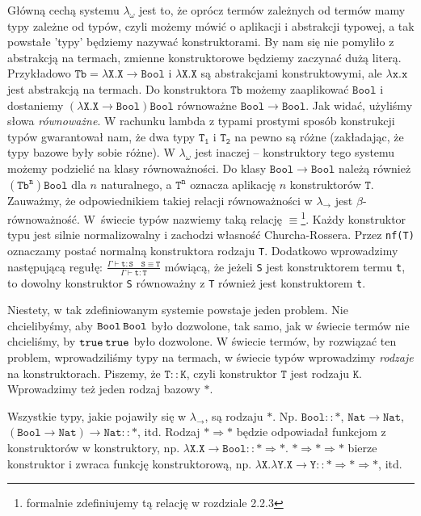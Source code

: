 \documentclass[11pt,leqno]{article}
\begin{document}
Główną cechą systemu $\lambda_{\omega}$ jest to, że oprócz termów zależnych od termów mamy typy zależne od typów, czyli możemy mówić o aplikacji i abstrakcji typowej, a tak powstałe 'typy' będziemy nazywać konstruktorami. By nam się nie pomyliło z abstrakcją na termach, zmienne konstruktorowe będziemy zaczynać dużą literą. Przykładowo $\mathtt{Tb=\lambda X.X \rightarrow Bool}$ i $\mathtt{\lambda X.X}$ są abstrakcjami konstruktowymi, ale $\mathtt{\lambda x.x}$ jest abstrakcją na termach. 
Do konstruktora $\mathtt{Tb}$ możemy zaaplikować $\mathtt{Bool}$ i dostaniemy $\mathtt{(\lambda X.X \rightarrow Bool)Bool}$ równoważne $\mathtt{Bool \rightarrow Bool}$. Jak widać, użyliśmy słowa \textit{równoważne}. W rachunku lambda z typami prostymi sposób konstrukcji typów gwarantował nam, że dwa typy $\mathtt{T_1}$ i $\mathtt{T_2}$ na pewno są różne (zakładając, że typy bazowe były sobie różne). W $\lambda_{\omega}$ jest inaczej -- konstruktory tego systemu możemy podzielić na klasy równoważności. Do klasy $\mathtt{Bool \rightarrow Bool}$ należą również $\mathtt{ (Tb^n) Bool }$ dla $n$ naturalnego, a $\mathtt{T^n}$ oznacza aplikację $n$ konstruktorów $\mathtt{T}$.
Zauważmy, że odpowiednikiem takiej relacji równoważności w $\lambda_{\rightarrow}$  jest $\beta$-równoważność. W~świecie typów nazwiemy taką relację $\equiv$\footnote{formalnie zdefiniujemy tą relację w rozdziale 2.2.3}. Każdy konstruktor typu jest silnie normalizowalny i zachodzi własność Churcha-Rossera. Przez \texttt{nf(T)} oznaczamy postać normalną konstruktora rodzaju \texttt{T}.
Dodatkowo wprowadzimy następującą regułę:
$\mathtt{\frac{\Gamma \vdash t:S \hspace{1em} S\equiv T  }{\Gamma \vdash t:T}}$
mówiącą, że jeżeli \texttt{S} jest konstruktorem termu \texttt{t}, to dowolny konstruktor \texttt{S} równoważny z \texttt{T} również jest konstruktorem \texttt{t}.  

Niestety, w tak zdefiniowanym systemie powstaje jeden problem. Nie chcielibyśmy, aby $\mathtt{Bool \hspace{0.2em} Bool}$ było dozwolone, tak samo, jak w świecie termów nie chcieliśmy, by $\mathtt{true \hspace{0.2em} true}$ było dozwolone. W świecie termów, by rozwiązać ten problem, wprowadziliśmy typy na termach, w świecie typów wprowadzimy \textit{rodzaje} na konstruktorach. Piszemy, że $\mathtt{T::K}$, czyli konstruktor $\mathtt{T}$ jest rodzaju $\mathtt{K}$. Wprowadzimy też jeden rodzaj bazowy $\mathtt{\ast}$.

Wszystkie typy, jakie pojawiły się w $\lambda_{\rightarrow}$, są rodzaju $\mathtt{\ast}$. Np. $\mathtt{Bool :: \ast}$, $\mathtt{Nat \rightarrow Nat}$, $\mathtt{(Bool \rightarrow Nat) \rightarrow Nat} :: \ast$, itd. Rodzaj $\mathtt{\ast \Rightarrow \ast}$ będzie odpowiadał funkcjom z konstruktorów w konstruktory, np. $\mathtt{\lambda X.X \rightarrow Bool::\ast \Rightarrow \ast }$. $\mathtt{\ast \Rightarrow \ast \Rightarrow \ast}$ bierze konstruktor i zwraca funkcję konstruktorową, np. $\mathtt{\lambda X. \lambda Y. X \rightarrow Y::\ast \Rightarrow \ast \Rightarrow \ast}$, itd. 
\end{document}
